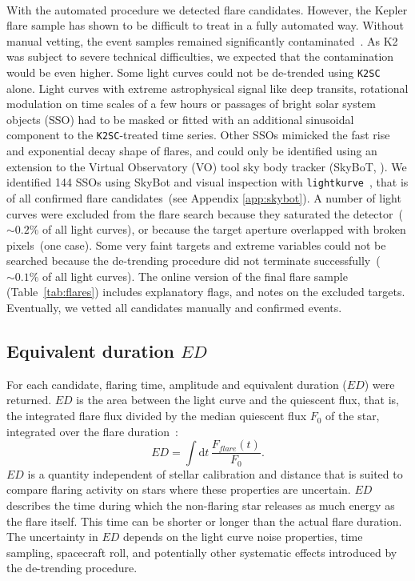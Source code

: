 \documentclass{aa}
\begin{document}
\\
With the automated procedure we detected flare candidates. However, the Kepler flare sample has shown to be difficult to treat in a fully automated way. Without manual vetting, the event samples remained significantly contaminated~\citep{yang2019}. As K2 was subject to severe technical difficulties, we expected that the contamination would be even higher. Some light curves could not be de-trended using \texttt{K2SC} alone. Light curves with extreme astrophysical signal like deep transits, rotational modulation on time scales of a few hours or passages of bright solar system objects (SSO) had to be masked or fitted with an additional sinusoidal component to the \texttt{K2SC}-treated time series. Other SSOs mimicked the fast rise and exponential decay shape of flares, and could only be identified using an extension to the Virtual Observatory (VO) tool sky body tracker (SkyBoT, \citealt{berthier2006, berthier2016}). We identified 144 SSOs using SkyBot and visual inspection with \texttt{lightkurve}~\citep{lightkurve2018}, that is of all confirmed flare candidates~(see Appendix \ref{app:skybot}). A number of light curves were excluded from the flare search because they saturated the detector~($\sim 0.2\%$ of all light curves), or because the target aperture overlapped with broken pixels~(one case). Some very faint targets and extreme variables could not be searched because the de-trending procedure did not terminate successfully~($\sim 0.1\%$ of all light curves). The online version of the final flare sample (Table~\ref{tab:flares}) includes explanatory flags, and notes on the excluded targets. Eventually, we vetted all candidates manually and confirmed events.
\subsection{Equivalent duration $ED$}
\label{sec:ed}
For each candidate, flaring time, amplitude and equivalent duration ($ED$) were returned.
$ED$ is the area between the light curve and the quiescent flux, that is, the integrated flare flux divided by the median quiescent flux $F_0$ of the star, integrated over the flare duration~\citep{gershberg1972}:
\begin{equation}
\label{eq:ED}
ED=\displaystyle \int \mathrm dt\, \frac{F_{flare}(t)}{F_0}.
\end{equation}
$ED$ is a quantity independent of stellar calibration and distance that is suited to compare flaring activity on stars where these properties are uncertain. $ED$ describes the time during which the non-flaring star releases as much energy as the flare itself. This time can be shorter or longer than the actual flare duration. The uncertainty in $ED$ depends on the light curve noise properties, time sampling, spacecraft roll, and potentially other systematic effects introduced by the de-trending procedure. 
\end{document}
